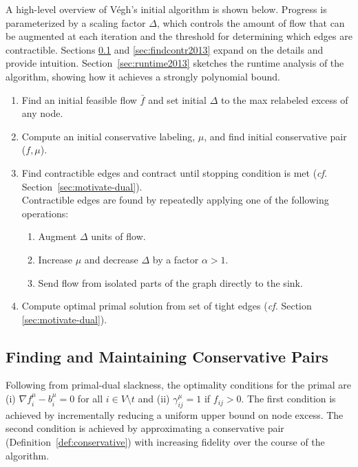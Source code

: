 \documentclass[11pt]{article}
\theoremstyle{definition}
\newtheorem{definition}{Definition}[section]
\theoremstyle{definition}
\theoremstyle{definition}
\newcommand{\fu}{f^{\mu}}
\newcommand{\nfiu}{\nabla \fu_i}
\newcommand{\biu}{b_{i}^{\mu}}
\newcommand{\giij}{\gamma_{ij}^{\mu}}
\newcommand{\vnott}{V \setminus t}
\begin{document}
A high-level overview of Végh's initial algorithm \cite{Vegh2013}
is shown below. Progress is parameterized by a scaling factor $\Delta$,
which controls the amount of flow that can be augmented at each iteration and the threshold for
determining which edges are contractible. Sections \ref{sec:findconserv2013} and
\ref{sec:findcontr2013} expand on the details and provide intuition.
Section~\ref{sec:runtime2013} sketches the runtime
analysis of the algorithm, showing how it achieves a strongly polynomial bound.

\begin{enumerate}[(1),itemsep=0mm]
\item Find an initial feasible flow $\bar{f}$ and set initial $\Delta$ to
	  the max relabeled excess of any node.
\item Compute an initial conservative labeling, $\mu$, and find initial conservative pair ($f,\mu$).
\item \label{step:2013-contract} Find contractible edges and contract until stopping condition is met
	(\emph{cf.} Section~\ref{sec:motivate-dual}).\\
	Contractible edges are found
	by repeatedly applying one of the following operations:
\begin{enumerate}[itemsep=0mm]
		\item \label{step:2013-augment} Augment $\Delta$ units of flow.
		\item \label{step:2013-scale} Increase $\mu$ and decrease $\Delta$ by a factor $\alpha > 1$.
		\item \label{step:2013-filtration} Send flow from isolated parts of the graph directly to the sink.
	\end{enumerate}
\item Compute optimal primal solution from set of tight edges (\emph{cf.} Section \ref{sec:motivate-dual}).
\end{enumerate}


\subsection{Finding and Maintaining Conservative Pairs}
\label{sec:findconserv2013}
Following from primal-dual slackness, the optimality conditions for the primal
are (i) $\nfiu - \biu = 0$ for all $i \in \vnott$ and (ii) $\giij = 1$ if
$f_{ij} > 0$. The first condition is achieved by incrementally reducing a uniform upper bound
on node excess. The second condition is
achieved by approximating a conservative pair (Definition~\ref{def:conservative})
with increasing fidelity over the course of the algorithm.
\end{document}
